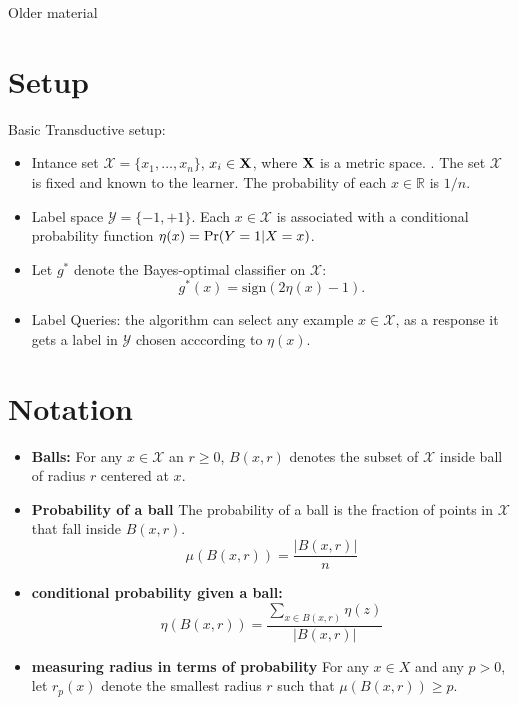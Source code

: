 \documentclass{article}
\def\R{{\mathbb{R}}}
\def\pr{{\rm Pr}}
\def\X{{\mathcal X}}
\def\Y{{\mathcal Y}}
\begin{document}
\begin{center}
\begin{huge}
Older material
\end{huge}
\end{center}

\pagebreak

\section{Setup}

Basic Transductive setup:
\begin{itemize}
\item Intance set $\X =\{x_1,\dots,x_n\}$, $x_i \in {\bf X}$, where
  ${\bf X}$ is a metric space. . The set
  $\X$ is fixed and known to the learner. The probability of each $x
  \in \R$ is $1/n$.
\item Label space $\Y = \{-1,+1\}$. Each $x \in \X$ is associated with
  a conditional probability function $\eta(x) = \pr(Y=1|X=x)$.
\item Let $g^*$ denote the Bayes-optimal classifier on $\X$:
  $$ g^*(x) = \mbox{sign}(2 \eta(x) - 1) .$$
  \item Label Queries: the algorithm can select any example $x \in
    \X$, as a response it gets a label in $\Y$ chosen acccording to
    $\eta(x)$.    
  \end{itemize}

\section{Notation}
\begin{itemize}
\item {\bf Balls:} For any $x \in \X$ an $r\geq0$,
  $B(x,r)$ denotes the subset of $\X$ inside ball of radius $r$ centered at $x$.
  \item {\bf Probability of a ball} The probability of a ball is the
    fraction of points in $\X$ that fall inside $B(x,r)$.
    $$ \mu(B(x,r)) = \frac{ |B(x,r)|}{n}$$
  \item {\bf conditional probability given a ball:}
    $$ \eta(B(x,r)) = \frac{\sum_{x \in B(x,r)}\eta(z)}{|B(x,r)|}$$
  \item {\bf measuring radius in terms of probability}
For any $x \in X$ and any $p > 0$, let $r_p(x)$ denote the smallest
radius $r$ such that $\mu(B(x, r)) \geq p$.
\end{itemize}

\newcommand{\NNB}{{\bf NNB}}
\newcommand{\ANNB}{{\bf ANNB}}
\newcommand{\ONNB}{{\bf oracle-NNB}}
\end{document}

